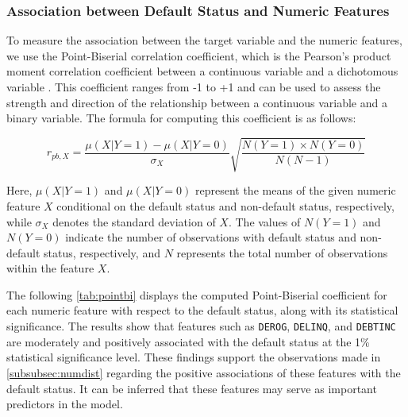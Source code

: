 \subsubsection{Association between Default Status and Numeric Features}
\label{subsubsec:target-num-ass}

To measure the association between the target variable and the numeric features, we use the Point-Biserial correlation coefficient, which is the Pearson's product moment correlation coefficient between a continuous variable and a dichotomous variable \citep{kornbrot2014point}.
This coefficient ranges from -1 to +1 and can be used to assess the strength and direction of the relationship between a continuous variable and a binary variable.
The formula for computing this coefficient is as follows:

\begin{equation}\label{eq}
r_{pb,X} =  \frac{\mu \left( X | Y=1 \right) -\mu \left( X | Y=0 \right)}{\sigma_{X}}\sqrt{\frac{N\left(Y=1\right) \times N\left(Y=0\right)}{N \left(N - 1 \right)}}
\end{equation}

Here, $\mu \left( X | Y=1 \right)$ and $\mu \left( X | Y=0 \right)$ represent the means of the given numeric feature $X$ conditional on the default status and non-default status, respectively, while $\sigma_{X}$ denotes the standard deviation of $X$.
The values of $N\left(Y=1\right)$ and $N\left(Y=0\right)$ indicate the number of observations with default status and non-default status, respectively, and $N$ represents the total number of observations within the feature $X$.


The following \autoref{tab:pointbi} displays the computed Point-Biserial coefficient for each numeric feature with respect to the default status, along with its statistical significance.
The results show that features such as \texttt{DEROG}, \texttt{DELINQ}, and \texttt{DEBTINC} are moderately and positively associated with the default status at the 1\% statistical significance level.
These findings support the observations made in \autoref{subsubsec:numdist} regarding the positive associations of these features with the default status. It can be inferred that these features may serve as important predictors in the model.

